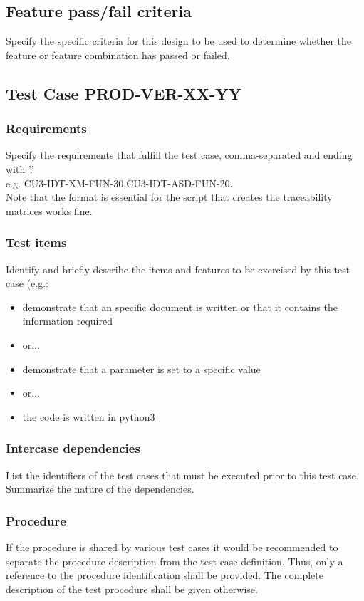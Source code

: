 \documentclass[DM,lsstdraft,STS,toc]{lsstdoc}
\def\product{PROD}
\begin{document}
\subsection{Feature pass/fail criteria \label{sect:passfail}}
Specify the specific criteria for this design to be used to determine whether the feature or feature combination has passed or failed.

\subsection{Test Case \product-VER-XX-YY \label{sect:testcaseid}}

\subsubsection{Requirements \label{sect:reqs}}
Specify the requirements that fulfill the test case, comma-separated and ending with '.'\\
e.g. CU3-IDT-XM-FUN-30,CU3-IDT-ASD-FUN-20.\\
Note that the format is essential for the script that creates the traceability matrices works fine.

\subsubsection{Test items \label{sect:tcitems}}
Identify and briefly describe the items and features to be exercised by this test case (e.g.:
\begin{itemize}
\item  demonstrate that an
specific document is written or that it contains the information required
\item or...
\item demonstrate that a parameter is set to a specific value
\item or...
\item the code is written in python3
\end{itemize}

\subsubsection{Intercase dependencies \label{interface_dependencies}}
List the identifiers of the test cases that must be executed prior to this test case. Summarize the nature of the dependencies.

\subsubsection{Procedure \label{procedures}}
If the procedure is shared by various test cases it would be recommended to separate the procedure description from the test
case definition. Thus, only a reference to the procedure identification shall be provided. The complete description of
the test procedure shall be given otherwise. \\
\end{document}
